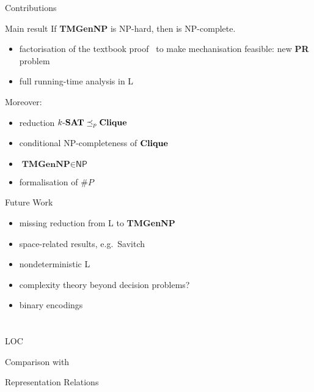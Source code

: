 \documentclass[11pt,usenames,dvipsnames,
hyperref={pdfencoding=auto,psdextra}]{beamer}
\makeatletter
\def\beamer@writeslidentry@miniframesoff{%
  \expandafter\beamer@ifempty\expandafter{\beamer@framestartpage}{}%
  {%
    \clearpage\beamer@notesactions%
  }
}
\newcommand*{\miniframesoff}{\let\beamer@writeslidentry=\beamer@writeslidentry@miniframesoff}
\newcommand*{\PR}{\textbf{PR}}
\newcommand*{\gennp}{\textbf{TMGenNP}}
\newcommand{\NP}{\textsf{NP}}
\newcommand{\redP}{\ensuremath{\preceq_p}}
\newcommand{\Clique}{\normalfont\textbf{Clique}}
\makeatother
\begin{document}
\begin{frame}{Contributions}
  \begin{block}{Main result}
    If \gennp{} is \NP{}-hard, then \SAT{} is \NP{}-complete. 
  \end{block}
  \begin{itemize}
    \item factorisation of the textbook proof~\cite{Sipser:TheoryofComputation} to make mechanisation feasible: new \PR{} problem
    \item full running-time analysis in L
  \end{itemize}

  Moreover: 
  \begin{itemize}
    \item reduction $\text{$k$-\SAT{}} \redP{} \Clique{}$
    \item conditional \NP{}-completeness of $\Clique{}$
    \item $\gennp{} \in \NP{}$
    \item formalisation of $\#P$
  \end{itemize}
\end{frame}

\begin{frame}{Future Work}
  \begin{itemize}
    \item missing reduction from L to \gennp{} 
    \item space-related results, e.g.\ Savitch
    \item nondeterministic L
    \item complexity theory beyond decision problems?
    \item binary encodings
  \end{itemize}
\end{frame}

\miniframesoff
\section{}

\begin{frame}{LOC}
\end{frame}

\begin{frame}{Comparison with~\cite{gamboa:cook}}

\end{frame}

\begin{frame}{Representation Relations}
\end{frame}
\end{document}
